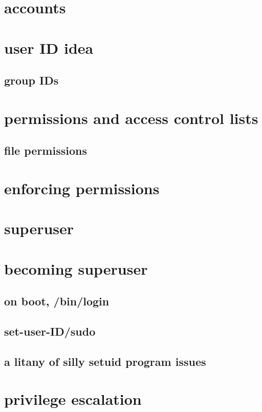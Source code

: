 \section{accounts}


\section{user ID idea}


\subsection{group IDs}


\section{permissions and access control lists}
\subsection{file permissions}



\section{enforcing permissions}


%

\section{superuser}


\section{becoming superuser}

\subsection{on boot, /bin/login}


\subsection{set-user-ID/sudo}




\subsection{a litany of silly setuid program issues}


\section{privilege escalation}



